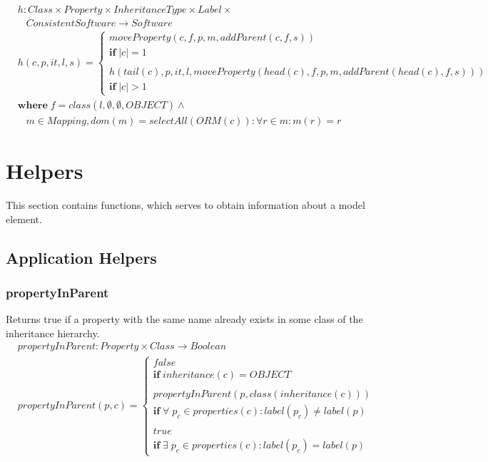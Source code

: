 \documentclass[10pt]{article}
\begin{document}
\begin{align}
& h: Class \times Property \times InheritanceType \times Label \times
\nonumber \\
& \;\;\; ConsistentSoftware \rightarrow Software \\
& h(c, p, it, l, s) = \begin{cases}
    moveProperty(c, f, p, m, addParent(c, f, s)) \\
    \mathbf{if} \; |c| = 1 \\
   \\
    h(tail(c), p, it, l, moveProperty(head(c), f, p, m, addParent(head(c), f, s)))\\
    \mathbf{if} \; |c| > 1
 \end{cases} \nonumber \\
&   \mathbf{where} \; f = class(l, \emptyset, \emptyset, OBJECT) \land  \\
&    \;\;\; m \in Mapping, dom(m) = selectAll(ORM(c)) : \forall r \in m :  m(r) = r 
\end{align}



\section{Helpers}
This section contains functions, which serves to obtain information about a model element.
\subsection{Application Helpers}

\subsubsection{propertyInParent}
Returns true if a property with the same name already exists in some class of the inheritance hierarchy.
\begin{align}
& propertyInParent: Property \times Class \rightarrow Boolean \\
& propertyInParent(p, c) = \begin{cases}
 false \\
 \mathbf{if} \; inheritance(c) = OBJECT \\ \\
 propertyInParent(p, class(inheritance(c))) \\
 \mathbf{if} \; \forall \; p_c \in properties(c) : label(p_c) \neq label(p) \\ \\
 true \\
 \mathbf{if} \; \exists \; p_c \in properties(c) : label(p_c) = label(p) 
 \end{cases}
\end{align}
\end{document}
